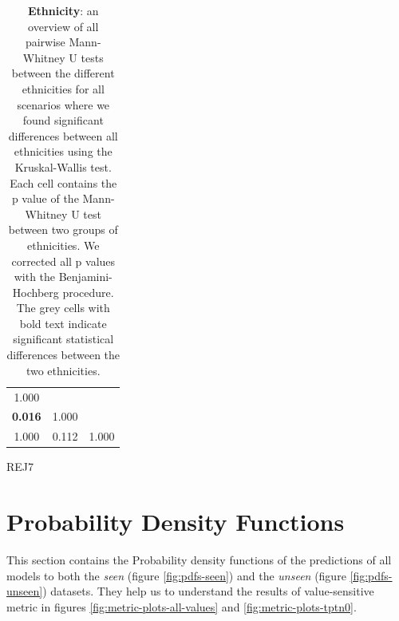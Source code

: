 \begin{table}[H]
\begin{subtable}{.21\textwidth}
\begin{tabular}{ccc}
            \midrule
            1.000                                  &                           &                           \\
            \cellcolor[HTML]{EFEFEF}\textbf{0.016} & \multicolumn{1}{r}{1.000} &                           \\
            1.000                                  & \multicolumn{1}{r}{0.112} & \multicolumn{1}{r}{1.000} \\
            \bottomrule
        \end{tabular}
        \caption{REJ7}
    \end{subtable}
    \caption{\textbf{Ethnicity}: an overview of all pairwise Mann-Whitney U tests between the different ethnicities for all scenarios where we found significant differences between all ethnicities using the Kruskal-Wallis test. Each cell contains the p value of the Mann-Whitney U test between two groups of ethnicities. We corrected all p values with the Benjamini-Hochberg procedure. The grey cells with bold text indicate significant statistical differences between the two ethnicities.}
    \label{tab:results-pairwise-ethnicity}
\end{table}

\section{Probability Density Functions}
This section contains the Probability density functions of the predictions of all models to both the \emph{seen} (figure \ref{fig:pdfs-seen}) and the \emph{unseen} (figure \ref{fig:pdfs-unseen}) datasets.
%
They help us to understand the results of value-sensitive metric in figures \ref{fig:metric-plots-all-values} and \ref{fig:metric-plots-tptn0}.

